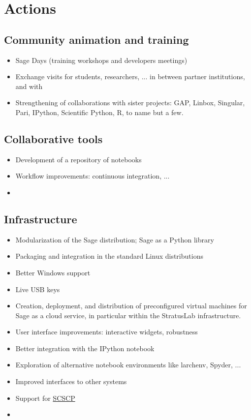 \section{Actions}

\subsection{Community animation and training}

\begin{itemize}
\item Sage Days (training workshops and developers meetings)
\item Exchange visits for students, researchers, ... in between
  partner institutions, and with 
\item Strengthening of collaborations with sister projects: GAP,
  Linbox, Singular, Pari, IPython, Scientific Python, R, to name but a
  few.
\end{itemize}

\subsection{Collaborative tools}

\begin{itemize}
\item Development of a repository of notebooks
\item Workflow improvements: continuous integration, ...
\item {}
\end{itemize}

\subsection{Infrastructure}

\begin{itemize}
\item Modularization of the Sage distribution; Sage as a Python library
\item Packaging and integration in the standard Linux distributions
\item Better Windows support
\item Live USB keys
\item Creation, deployment, and distribution of preconfigured virtual
  machines for Sage as a cloud service, in particular within the
  StratusLab infrastructure.
\item User interface improvements: interactive widgets, robustness
\item Better integration with the IPython notebook
\item Exploration of alternative notebook environments like larchenv,
  Spyder, ...
\item Improved interfaces to other systems
\item Support for \href{http://www.symbolic-computing.org/}{SCSCP}
\item {}
\end{itemize}

